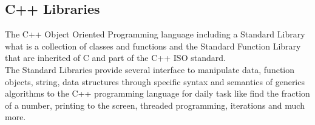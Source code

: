 \documentclass[12pt]{article}
\begin{document}
\subsection{C++ Libraries}
The C++ Object Oriented Programming language including a Standard Library what is a collection of classes and functions and the Standard Function Library that are inherited of C and part of the C++ ISO standard.\cite{Tutorialspointlibraries}\\

The Standard Libraries provide several interface to manipulate data, function objects, string, data structures through specific syntax and semantics of generics algorithms to the C++ programming language for daily task like find the fraction of a number, printing to the screen, threaded programming, iterations and much more.\\ \cite{Tutorialspoint}
\end{document}
